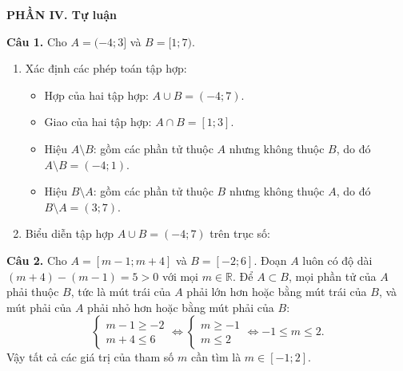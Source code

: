 \documentclass[12pt,a4paper]{article}
\begin{document}
\vspace{0.2cm}
\textbf{\large PHẦN IV. Tự luận}

\textbf{Câu 1.} Cho $A = (-4; 3]$ và $B = [1; 7)$.
\begin{enumerate}
    \item Xác định các phép toán tập hợp:
    \begin{itemize}[leftmargin=0.5cm, itemsep=1pt, topsep=1pt]
        \item Hợp của hai tập hợp: $A \cup B = (-4; 7)$.
        \item Giao của hai tập hợp: $A \cap B = [1; 3]$.
        \item Hiệu $A \setminus B$: gồm các phần tử thuộc $A$ nhưng không thuộc $B$, do đó $A \setminus B = (-4; 1)$.
        \item Hiệu $B \setminus A$: gồm các phần tử thuộc $B$ nhưng không thuộc $A$, do đó $B \setminus A = (3; 7)$.
    \end{itemize}
    \item Biểu diễn tập hợp $A \cup B = (-4; 7)$ trên trục số:
    \begin{center}
    \end{center}
\end{enumerate}

\textbf{Câu 2.} Cho $A = [m - 1; m + 4]$ và $B = [-2; 6]$.
Đoạn $A$ luôn có độ dài $(m + 4) - (m - 1) = 5 > 0$ với mọi $m \in \mathbb{R}$.
Để $A \subset B$, mọi phần tử của $A$ phải thuộc $B$, tức là mút trái của $A$ phải lớn hơn hoặc bằng mút trái của $B$, và mút phải của $A$ phải nhỏ hơn hoặc bằng mút phải của $B$:
\[
\begin{cases}
m - 1 \ge -2 \\
m + 4 \le 6
\end{cases}
\iff
\begin{cases}
m \ge -1 \\
m \le 2
\end{cases}
\iff -1 \le m \le 2.
\]
Vậy tất cả các giá trị của tham số $m$ cần tìm là $m \in [-1; 2]$.
\end{document}
